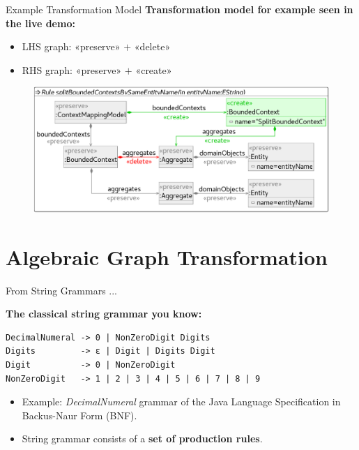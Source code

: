 \documentclass[10pt]{beamer}
\begin{document}
\begin{frame}{Example Transformation Model}
	\textbf{Transformation model for example seen in the live demo:}
	\begin{itemize}
		\item LHS graph: «preserve» $+$ «delete»
		\item RHS graph: «preserve» $+$ «create»
	\end{itemize}
	\begin{figure}[H]
		\centering
		\includegraphics[width=1.0\textwidth]{ContextMapRefactoring_Example}
	\end{figure} 
\end{frame}

\section{Algebraic Graph Transformation}

\begin{frame}[fragile]{From String Grammars ...}

\textbf{The classical string grammar you know:}

\begin{center}
\begin{lstlisting}
DecimalNumeral -> 0 | NonZeroDigit Digits
Digits         -> ε | Digit | Digits Digit
Digit          -> 0 | NonZeroDigit
NonZeroDigit   -> 1 | 2 | 3 | 4 | 5 | 6 | 7 | 8 | 9
\end{lstlisting}
\end{center}

\begin{itemize}
	\item Example: \textit{DecimalNumeral} grammar of the Java Language Specification in Backus-Naur Form (BNF).
	\item String grammar consists of a \textbf{set of production rules}.
\end{itemize}

\end{frame}
\end{document}
